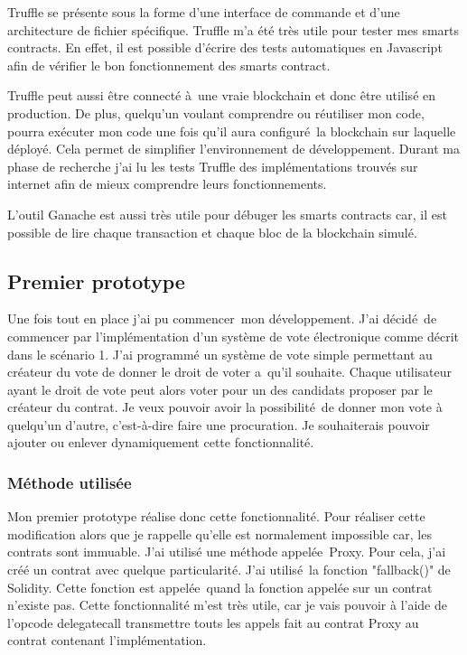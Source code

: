 Truffle se présente sous la forme d'une interface de commande et d'une architecture de fichier spécifique. Truffle m'a été très
utile pour tester mes smarts contracts. En effet, il est possible d'écrire des tests automatiques en Javascript afin
de vérifier le bon fonctionnement des smarts contract.

Truffle peut aussi être connecté à une vraie blockchain et donc être utilisé en production. De plus, quelqu'un voulant comprendre
ou réutiliser mon code, pourra exécuter mon code une fois qu'il aura configuré la blockchain sur laquelle déployé. Cela permet 
de simplifier l'environnement de développement. Durant ma phase
de recherche j'ai lu les tests Truffle des implémentations trouvés sur internet afin de mieux comprendre leurs fonctionnements.

L'outil Ganache est aussi très utile pour débuger les smarts contracts car, il est possible de lire chaque transaction et chaque
bloc de la blockchain simulé.

\subsection{Premier prototype}

Une fois tout en place j'ai pu commencer mon développement. J'ai décidé de commencer par l'implémentation d'un système de vote 
électronique comme décrit dans le scénario 1. J'ai programmé un système de vote simple permettant au créateur du vote de donner
le droit de voter a qu'il souhaite. Chaque utilisateur ayant le droit de vote peut alors voter pour un des candidats proposer par
le créateur du contrat. Je veux pouvoir avoir la possibilité de donner mon vote à quelqu'un d'autre, c'est-à-dire faire une 
procuration. Je souhaiterais pouvoir ajouter ou enlever dynamiquement cette fonctionnalité.

\subsubsection{Méthode utilisée}

Mon premier prototype réalise donc cette fonctionnalité. Pour réaliser cette modification alors que je rappelle 
qu'elle est normalement impossible car, les contrats sont immuable. J'ai utilisé une méthode appelée Proxy.
Pour cela, j'ai créé un contrat avec quelque particularité. J'ai utilisé la fonction "fallback()" de Solidity.
Cette fonction est appelée quand la fonction appelée sur un contrat n'existe pas. Cette fonctionnalité m'est très
utile, car je vais pouvoir à l'aide de l'opcode delegatecall transmettre touts les appels fait au contrat Proxy
au contrat contenant l'implémentation.

